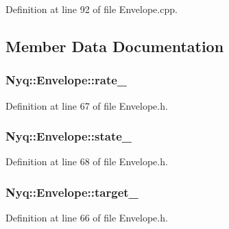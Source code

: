 Definition at line 92 of file Envelope.\+cpp.



\subsection{Member Data Documentation}
\subsubsection[{\texorpdfstring{rate\+\_\+}{rate_}}]{ Nyq\+::\+Envelope\+::rate\+\_\+\hspace{0.3cm}{\ttfamily [protected]}}\hypertarget{class_nyq_1_1_envelope_ab33da3db41af1c55705a471720843727}{}\label{class_nyq_1_1_envelope_ab33da3db41af1c55705a471720843727}


Definition at line 67 of file Envelope.\+h.

\subsubsection[{\texorpdfstring{state\+\_\+}{state_}}]{ Nyq\+::\+Envelope\+::state\+\_\+\hspace{0.3cm}{\ttfamily [protected]}}\hypertarget{class_nyq_1_1_envelope_a9a0154ef9655e04dd459d6ee6d60504f}{}\label{class_nyq_1_1_envelope_a9a0154ef9655e04dd459d6ee6d60504f}


Definition at line 68 of file Envelope.\+h.

\subsubsection[{\texorpdfstring{target\+\_\+}{target_}}]{ Nyq\+::\+Envelope\+::target\+\_\+\hspace{0.3cm}{\ttfamily [protected]}}\hypertarget{class_nyq_1_1_envelope_ac7c1316fcd3048369131f4e801341d52}{}\label{class_nyq_1_1_envelope_ac7c1316fcd3048369131f4e801341d52}


Definition at line 66 of file Envelope.\+h.

